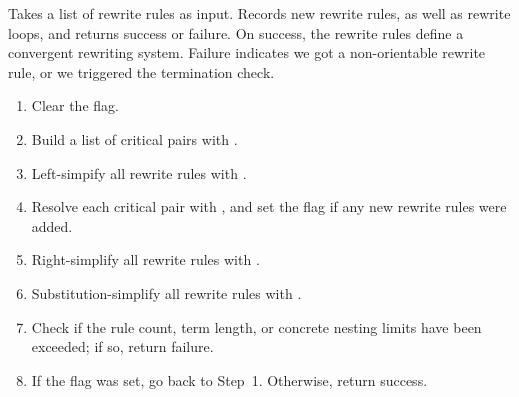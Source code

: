 \documentclass[../generics]{subfiles}
\begin{document}
\begin{algorithm}\label{knuthbendix} Takes a list of rewrite rules as input. Records new rewrite rules, as well as rewrite loops, and returns success or failure. On success, the rewrite rules define a convergent rewriting system. Failure indicates we got a non-orientable rewrite rule, or we triggered the termination check.
\begin{enumerate}
\item Clear the flag.
\item Build a list of critical pairs with .
\item Left-simpify all rewrite rules with .
\item Resolve each critical pair with , and set the flag if any new rewrite rules were added.
\item Right-simplify all rewrite rules with .
\item Substitution-simplify all rewrite rules with .
\item Check if the rule count, term length, or concrete nesting limits have been exceeded; if so, return failure.
\item If the flag was set, go back to Step~1. Otherwise, return success.
\end{enumerate}
\end{algorithm}
\end{document}
